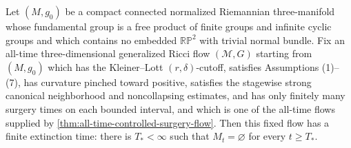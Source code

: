 \begin{theorem}
\label{thm:finite-time-extinction}
\notready
Let $(M,g_0)$ be a compact connected normalized Riemannian three-manifold
whose fundamental group is a free product of finite groups and infinite
cyclic groups and which contains no embedded $\mathbb{RP}^2$ with trivial
normal bundle.  Fix an all-time three-dimensional generalized Ricci flow
$({\mathcal M},G)$ starting from $(M,g_0)$ which has the
Kleiner--Lott $(r,\delta)$-cutoff, satisfies Assumptions (1)--(7), has
curvature pinched toward positive, satisfies the stagewise strong canonical
neighborhood and noncollapsing estimates, and has only finitely many surgery
times on each bounded interval, and which is one of the all-time flows
supplied by \ref{thm:all-time-controlled-surgery-flow}.  Then this fixed flow has a
finite extinction time: there is $T_*<\infty$ such that
$M_t=\varnothing$ for every $t\ge T_*$.
\end{theorem}

